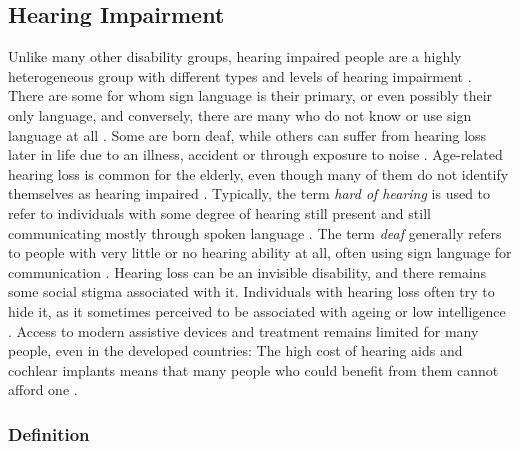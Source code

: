 \documentclass[english, 12pt, a4paper, pdftex, elec, utf8]{aaltothesis}
\begin{document}
\subsection{Hearing Impairment} \label{subsec:hear}

Unlike many other disability groups, hearing impaired people are a highly heterogeneous group with different types and levels of hearing impairment \cite{cavender2008hearing}. There are some for whom sign language is their primary, or even possibly their only language, and conversely, there are many who do not know or use sign language at all \cite{raino2012sisakorvaistutteen}. Some are born deaf, while others can suffer from hearing loss later in life due to an illness, accident or through exposure to noise \cite{moore2007cochlear}. Age-related hearing loss is common for the elderly, even though many of them do not identify themselves as hearing impaired \cite{salonen2013hearing}. Typically, the term \textit{hard of hearing} is used to refer to individuals with some degree of hearing still present and still communicating mostly through spoken language \cite{deafness}. The term \textit{deaf} generally refers to people with very little or no hearing ability at all, often using sign language for communication \cite{deafness}. Hearing loss can be an invisible disability, and there remains some social stigma associated with it. Individuals with hearing loss often try to hide it, as it sometimes perceived to be associated with ageing or low intelligence \cite{wilson2017global, salonen2013hearing}. Access to modern assistive devices and treatment remains limited for many people, even in the developed countries: The high cost of hearing aids and cochlear implants means that many people who could benefit from them cannot afford one \cite{wilson2017global}.

\subsubsection{Definition}
\end{document}
